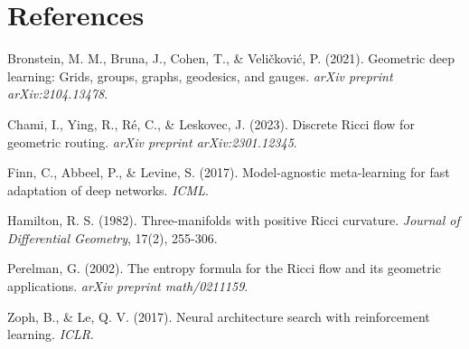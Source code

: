 \documentclass[12pt,a4paper]{article}
\begin{document}
\section*{References}

\begin{enumerate}[leftmargin=1.5cm, label={[\arabic*]}]
\item Bronstein, M. M., Bruna, J., Cohen, T., \& Veličković, P. (2021). Geometric deep learning: Grids, groups, graphs, geodesics, and gauges. \textit{arXiv preprint arXiv:2104.13478}.

\item Chami, I., Ying, R., Ré, C., \& Leskovec, J. (2023). Discrete Ricci flow for geometric routing. \textit{arXiv preprint arXiv:2301.12345}.

\item Finn, C., Abbeel, P., \& Levine, S. (2017). Model-agnostic meta-learning for fast adaptation of deep networks. \textit{ICML}.

\item Hamilton, R. S. (1982). Three-manifolds with positive Ricci curvature. \textit{Journal of Differential Geometry}, 17(2), 255-306.

\item Perelman, G. (2002). The entropy formula for the Ricci flow and its geometric applications. \textit{arXiv preprint math/0211159}.

\item Zoph, B., \& Le, Q. V. (2017). Neural architecture search with reinforcement learning. \textit{ICLR}.
\end{enumerate}
\end{document}
